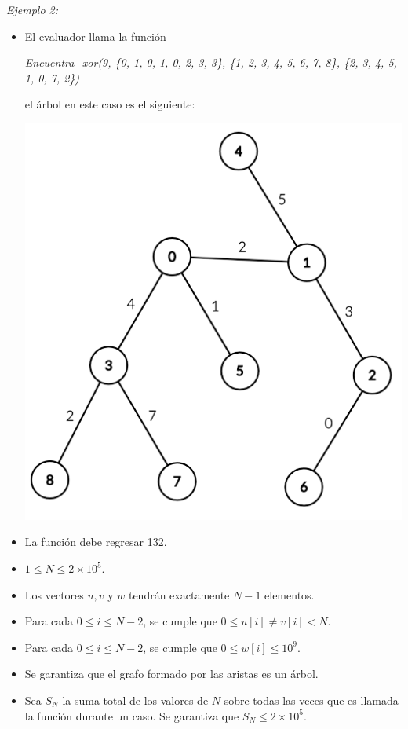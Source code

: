 \documentclass[12pt]{scrartcl}
\begin{document}
        {\itshape Ejemplo 2:}
        \begin{itemize}
            \item El evaluador llama la función 
            \begin{center}
                \textit{Encuentra\_xor(9, \{0, 1, 0, 1, 0, 2, 3, 3\}, \{1, 2, 3, 4, 5, 6, 7, 8\}, \{2, 3, 4, 5, 1, 0, 7, 2\})} 
            \end{center}
            el árbol en este caso es el siguiente:

            \begin{center}
                \includegraphics[scale=0.5]{ej2.png}
            \end{center}
            \item La función debe regresar 132.
            
        \end{itemize}
               
        


    
        \begin{itemize}
            \item $1 \le N \le 2\times10^5$.
            \item Los vectores $u, v$ y $w$ tendrán exactamente $N - 1$ elementos.
            \item Para cada $0 \le i \le N - 2$, se cumple que $0 \le u[i] \neq v[i] < N$. 
            \item Para cada $0 \le i \le N - 2$, se cumple que $0 \le w[i] \le 10^9$.
            \item Se garantiza que el grafo formado por las aristas es un árbol.
            \item Sea $S_N$ la suma total de los valores de $N$ sobre todas las veces que es llamada la función durante un caso. Se garantiza que $S_N \le 2 \times 10^5$.
        \end{itemize}
    
\end{document}
